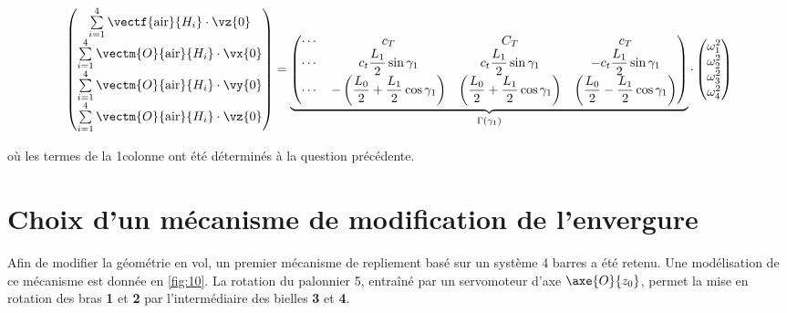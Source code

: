 $$
\begin{pmatrix}
\sum\limits_{i=1}^{4} \vectf{\text{air}}{H_i} \cdot\vz{0} \\
\sum\limits_{i=1}^{4} \vectm{O}{\text{air}}{H_i} \cdot\vx{0} \\
\sum\limits_{i=1}^{4} \vectm{O}{\text{air}}{H_i} \cdot\vy{0} \\
\sum\limits_{i=1}^{4} \vectm{O}{\text{air}}{H_i} \cdot\vz{0} 
\end{pmatrix}
=
\underbrace{\begin{pmatrix}
\cdots & c_T & C_T & c_T  \\
\cdots & c_t \dfrac{L_1}{2} \sin \gamma_1 & c_t \dfrac{L_1}{2} \sin \gamma_1 & - c_t \dfrac{L_1}{2} \sin \gamma_1 \\
\cdots 
& - \left(\dfrac{L_0}{2} + \dfrac{L_1}{2} \cos \gamma_1 \right) 
& \left(\dfrac{L_0}{2}   + \dfrac{L_1}{2} \cos \gamma_1 \right) 
& \left(\dfrac{L_0}{2}   - \dfrac{L_1}{2} \cos \gamma_1 \right) \\ 
\end{pmatrix}}_{\Gamma(\gamma_1)}
\cdot
\begin{pmatrix}
\omega_1^2 \\
\omega_2^2 \\
\omega_3^2 \\
\omega_4^2 \\
\end{pmatrix}
$$

où les termes de la 1\iere colonne ont été déterminés à la question précédente.

\ifprof
\begin{corrige}
\end{corrige}
\else
\fi

\section{\label{sec:02} Choix d’un mécanisme de modification de l’envergure}
Afin de modifier la géométrie en vol, un premier mécanisme de repliement basé sur un système 4 barres a été retenu. Une modélisation de ce mécanisme est donnée en \autoref{fig:10}. La
rotation du palonnier 5, entraîné par un servomoteur d’axe $\axe{O}{z_0}$, permet la mise en rotation
des bras \textbf{1} et \textbf{2} par l’intermédiaire des bielles \textbf{3} et \textbf{4}.

